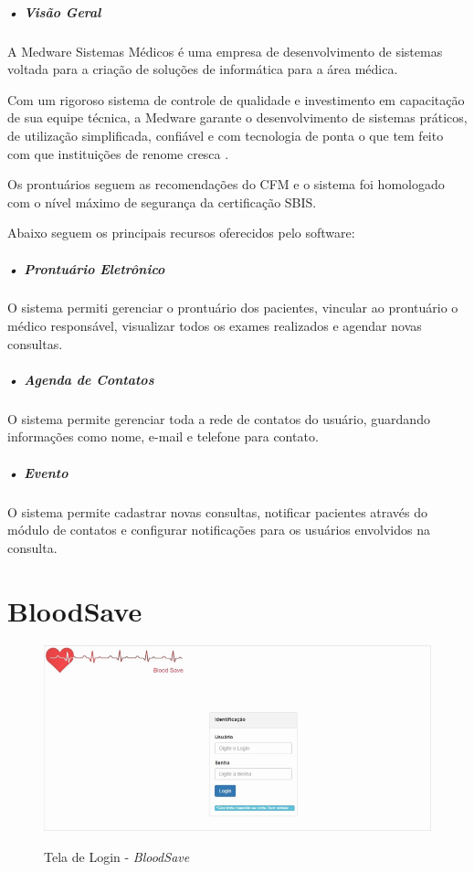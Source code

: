 \documentclass[portuguese,oneside]{tcc}
\begin{document}
\subparagraph{• Visão Geral}
A Medware Sistemas Médicos é uma empresa de desenvolvimento de sistemas voltada para a criação de soluções de informática para a área médica.

Com um rigoroso sistema de controle de qualidade e investimento em capacitação de sua equipe técnica, a Medware garante o desenvolvimento de sistemas práticos, de utilização simplificada, confiável e com tecnologia de ponta o que tem feito com que instituições de renome cresca \cite{MEDWARE}.

Os prontuários seguem as recomendações do CFM e o sistema foi homologado com o nível máximo de segurança da certificação SBIS.

Abaixo seguem os principais recursos oferecidos pelo software:

\subparagraph{• Prontuário Eletrônico}
O sistema permiti gerenciar o prontuário dos pacientes, vincular ao prontuário o médico responsável, visualizar todos os exames realizados e agendar novas consultas.

\subparagraph{• Agenda de Contatos}
O sistema permite gerenciar toda a rede de contatos do usuário, guardando informações como nome, e-mail e telefone para contato.

\subparagraph{• Evento}
O sistema permite cadastrar novas consultas, notificar pacientes através do módulo de contatos e configurar notificações para os usuários envolvidos na consulta.


\newpage

\section{BloodSave}

\begin{figure}[htp]
\centering
\caption{Tela de Login - \textit{BloodSave}}
\includegraphics[width=15cm]{bloodsave}
\label{fig:bloodsave}
\end{figure}
\end{document}
